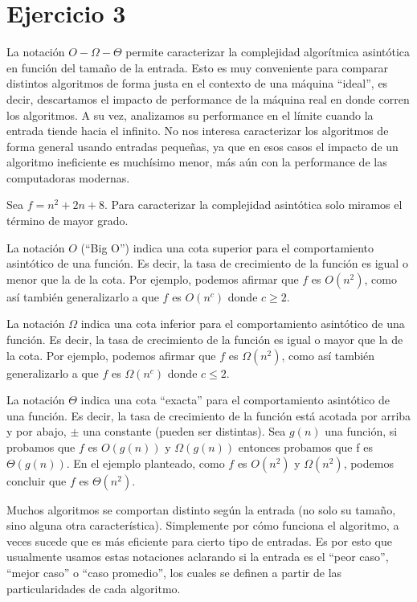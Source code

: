 \section*{Ejercicio 3}

La notación $O-\Omega-\Theta$ permite caracterizar la complejidad algorítmica asintótica en función del tamaño de la entrada. Esto es muy conveniente para comparar distintos algoritmos de forma justa en el contexto de una máquina ``ideal'', es decir, descartamos el impacto de performance de la máquina real en donde corren los algoritmos. A su vez, analizamos su performance en el límite cuando la entrada tiende hacia el infinito. No nos interesa caracterizar los algoritmos de forma general usando entradas pequeñas, ya que en esos casos el impacto de un algoritmo ineficiente es muchísimo menor, más aún con la performance de las computadoras modernas.

Sea $f = n^2 + 2n + 8$. Para caracterizar la complejidad asintótica solo miramos el término de mayor grado.

La notación $O$ (``Big O'') indica una cota superior para el comportamiento asintótico de una función. Es decir, la tasa de crecimiento de la función es igual o menor que la de la cota. Por ejemplo, podemos afirmar que $f$ es $O(n^2)$, como así también generalizarlo a que $f$ es $O(n^c)$ donde $c \geq 2$.

La notación $\Omega$ indica una cota inferior para el comportamiento asintótico de una función. Es decir, la tasa de crecimiento de la función es igual o mayor que la de la cota. Por ejemplo, podemos afirmar que $f$ es $\Omega(n^2)$, como así también generalizarlo a que $f$ es $\Omega(n^c)$ donde $c \leq 2$.

La notación $\Theta$ indica una cota ``exacta'' para el comportamiento asintótico de una función. Es decir, la tasa de crecimiento de la función está acotada por arriba y por abajo, $\pm$ una constante (pueden ser distintas). Sea $g(n)$ una función, si probamos que $f$ es $O(g(n))$ y $\Omega(g(n))$ entonces probamos que f es $\Theta(g(n))$. En el ejemplo planteado, como $f$ es $O(n^2)$ y $\Omega(n^2)$, podemos concluir que $f$ es $\Theta(n^2)$.

Muchos algoritmos se comportan distinto según la entrada (no solo su tamaño, sino alguna otra característica). Simplemente por cómo funciona el algoritmo, a veces sucede que es más eficiente para cierto tipo de entradas. Es por esto que usualmente usamos estas notaciones aclarando si la entrada es el ``peor caso'', ``mejor caso'' o ``caso promedio'', los cuales se definen a partir de las particularidades de cada algoritmo.

